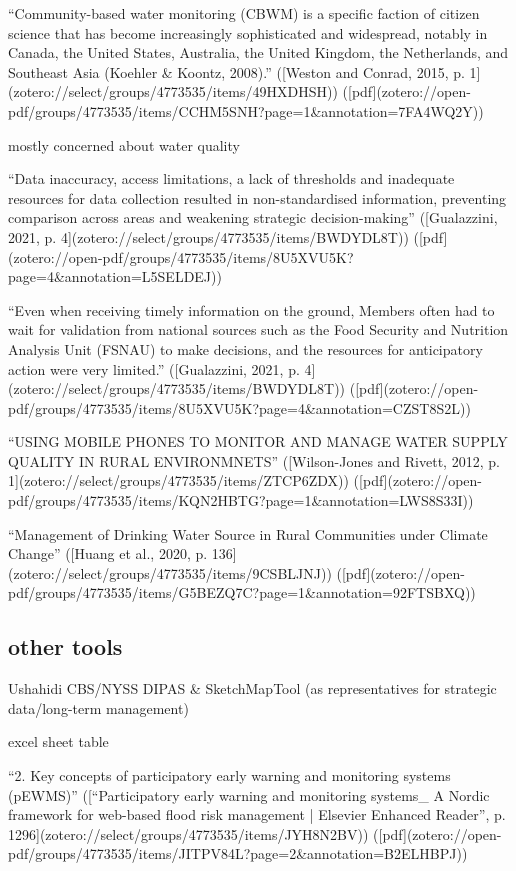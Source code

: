 {“Community-based water monitoring (CBWM) is a specific faction of citizen science that has become increasingly sophisticated and widespread, notably in Canada, the United States, Australia, the United Kingdom, the Netherlands, and Southeast Asia (Koehler & Koontz, 2008).” ([Weston and Conrad, 2015, p. 1](zotero://select/groups/4773535/items/49HXDHSH)) ([pdf](zotero://open-pdf/groups/4773535/items/CCHM5SNH?page=1&annotation=7FA4WQ2Y))

mostly concerned about water quality

“Data inaccuracy, access limitations, a lack of thresholds and inadequate resources for data collection resulted in non-standardised information, preventing comparison across areas and weakening strategic decision-making” ([Gualazzini, 2021, p. 4](zotero://select/groups/4773535/items/BWDYDL8T)) ([pdf](zotero://open-pdf/groups/4773535/items/8U5XVU5K?page=4&annotation=L5SELDEJ))

“Even when receiving timely information on the ground, Members often had to wait for validation from national sources such as the Food Security and Nutrition Analysis Unit (FSNAU) to make decisions, and the resources for anticipatory action were very limited.” ([Gualazzini, 2021, p. 4](zotero://select/groups/4773535/items/BWDYDL8T)) ([pdf](zotero://open-pdf/groups/4773535/items/8U5XVU5K?page=4&annotation=CZST8S2L))

“USING MOBILE PHONES TO MONITOR AND MANAGE WATER SUPPLY QUALITY IN RURAL ENVIRONMNETS” ([Wilson-Jones and Rivett, 2012, p. 1](zotero://select/groups/4773535/items/ZTCP6ZDX)) ([pdf](zotero://open-pdf/groups/4773535/items/KQN2HBTG?page=1&annotation=LWS8S33I))

“Management of Drinking Water Source in Rural Communities under Climate Change” ([Huang et al., 2020, p. 136](zotero://select/groups/4773535/items/9CSBLJNJ)) ([pdf](zotero://open-pdf/groups/4773535/items/G5BEZQ7C?page=1&annotation=92FTSBXQ))

\subsection{other tools}

Ushahidi
CBS/NYSS
DIPAS \& SketchMapTool (as representatives for strategic data/long-term management)

excel sheet table

“2. Key concepts of participatory early warning and monitoring systems (pEWMS)” ([“Participatory early warning and monitoring systems_ A Nordic framework for web-based flood risk management | Elsevier Enhanced Reader”, p. 1296](zotero://select/groups/4773535/items/JYH8N2BV)) ([pdf](zotero://open-pdf/groups/4773535/items/JITPV84L?page=2&annotation=B2ELHBPJ))

}
